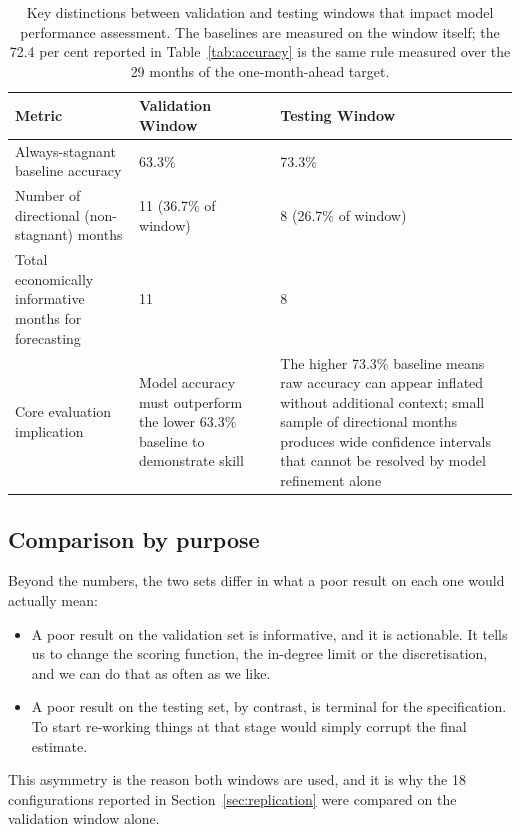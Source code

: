 \documentclass[11pt,a4paper]{article}
\begin{document}
\begin{table}[H]
\centering
\caption{Key distinctions between validation and testing windows that impact model performance
assessment. The baselines are measured on the window itself; the 72.4 per cent reported in
Table~\ref{tab:accuracy} is the same rule measured over the 29 months of the one-month-ahead
target.}
\label{tab:window_implications}
\renewcommand{\arraystretch}{1.3}
\begin{tabular}{@{}p{3.5cm}p{5.2cm}p{5.2cm}@{}}
\toprule
\textbf{Metric} & \textbf{Validation Window} & \textbf{Testing Window} \\
\midrule
Always-stagnant baseline accuracy & 63.3\% & 73.3\% \\
Number of directional (non-stagnant) months & 11 (36.7\% of window) & 8 (26.7\% of window) \\
Total economically informative months for forecasting & 11 & 8 \\
\midrule
Core evaluation implication & Model accuracy must outperform the lower 63.3\% baseline to demonstrate skill & The higher 73.3\% baseline means raw accuracy can appear inflated without additional context; small sample of directional months produces wide confidence intervals that cannot be resolved by model refinement alone \\
\bottomrule
\end{tabular}
\end{table}

\subsection{Comparison by purpose}

Beyond the numbers, the two sets differ in what a poor result on each one would actually mean:

\begin{itemize}
    \item A poor result on the validation set is informative, and it is actionable. It tells us to
    change the scoring function, the in-degree limit or the discretisation, and we can do that as
    often as we like.
    \item A poor result on the testing set, by contrast, is terminal for the specification. To
    start re-working things at that stage would simply corrupt the final estimate.
\end{itemize}

This asymmetry is the reason both windows are used, and it is why the 18 configurations reported
in Section~\ref{sec:replication} were compared on the validation window alone.
\end{document}
